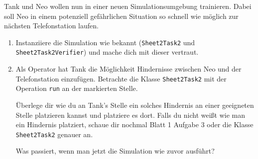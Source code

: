 

Tank und Neo wollen nun in einer neuen Simulationsumgebung trainieren.
Dabei soll Neo in einem potenziell gefährlichen Situation so schnell wie möglich zur nächsten Telefonstation laufen.

\begin{enumerate}
    \item Instanziiere die Simulation wie bekannt (\lstinline{Sheet2Task2} und \lstinline{Sheet2Task2Verifier}) und mache dich mit dieser vertraut.
    \item Als Operator hat Tank die Möglichkeit Hindernisse zwischen Neo und der Telefonstation einzufügen.
        Betrachte die Klasse \lstinline{Sheet2Task2} mit der Operation \lstinline{run} an der markierten Stelle.

        Überlege dir wie du an Tank's Stelle ein solches Hindernis an einer geeigneten Stelle platzieren kannst und platziere es dort.
        Falls du nicht weißt wie man ein Hindernis platziert, schaue dir nochmal Blatt 1 Aufgabe 3 oder die Klasse \lstinline{Sheet2Task2} genauer an.

        Was passiert, wenn man jetzt die Simulation wie zuvor ausführt?

\end{enumerate}

